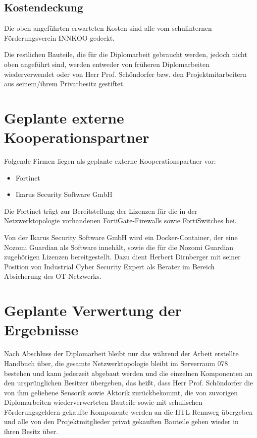 \documentclass[
	headings=optiontotocandhead,%
	oneside,
	numbers=noenddot,%
	toc=flat, %
	10pt, %
	parskip=full, %
	listof=totoc, %
	listof=flat, %
	numbers=noenddot, %
	bibliography=totoc, %
	a4paper,DIV=14,
]{scrartcl}
\begin{document}
\subsection{Kostendeckung}
Die oben angeführten erwarteten Kosten sind alle vom schulinternen Förderungsverein INNKOO gedeckt.

Die restlichen Bauteile, die für die Diplomarbeit gebraucht werden, jedoch nicht oben angeführt sind, werden entweder von früheren Diplomarbeiten wiederverwendet oder von Herr Prof. Schöndorfer bzw. den Projektmitarbeitern aus seinem/ihrem Privatbesitz gestiftet.

\newpage
\section{Geplante externe Kooperationspartner}
Folgende Firmen liegen als geplante externe Kooperationspartner vor:
\begin{itemize}
	\item{Fortinet}
	\item{Ikarus Security Software GmbH}
\end{itemize}
Die Fortinet trägt zur Bereitstellung der Lizenzen für die in der Netzwerktopologie vorhandenen FortiGate-Firewalls sowie FortiSwitches bei.

Von der Ikarus Security Software GmbH wird ein Docker-Container, der eine Nozomi Guardian als Software innehält, sowie die für die Nozomi Guardian zugehörigen Lizenzen bereitgestellt. Dazu dient Herbert Dirnberger mit seiner Position von Industrial Cyber Security Expert als Berater im Bereich Absicherung des OT-Netzwerks.

\newpage
\section{Geplante Verwertung der Ergebnisse}
Nach Abschluss der Diplomarbeit bleibt nur das während der Arbeit erstellte Handbuch über, die gesamte Netzwerktopologie bleibt im Serverraum 078 bestehen und kann jederzeit abgebaut werden und die einzelnen Komponenten an den ursprünglichen Besitzer übergeben, das heißt, dass Herr Prof. Schöndorfer die von ihm geliehene Sensorik sowie Aktorik zurückbekommt, die von zuvorigen Diplomarbeiten wiederverwerteten Bauteile sowie mit schulischen Förderungsgeldern gekaufte Komponente werden an die HTL Rennweg übergeben und alle von den Projektmitglieder privat gekauften Bauteile gehen wieder in ihren Besitz über. 
\end{document}
